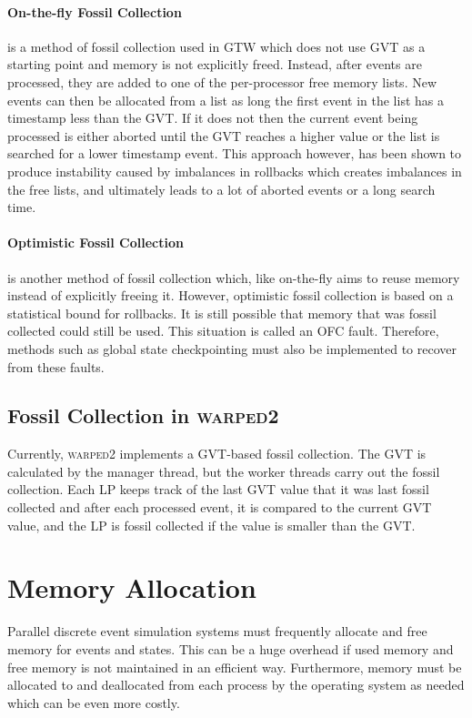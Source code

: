 \documentclass[11pt]{book}
\begin{document}
\paragraph{On-the-fly Fossil Collection} is a method of fossil collection used in GTW
which does not use GVT as a starting point and memory is not explicitly freed. Instead, after
events are processed, they are added to one of the per-processor free memory lists. New events
can then be allocated from a list as long the first event in the list has a timestamp less than
the GVT. If it does not then the current event being processed is either aborted until the GVT
reaches a higher value or the list is searched for a lower timestamp event. This approach however,
has been shown to produce instability caused by imbalances in rollbacks which creates imbalances
in the free lists, and ultimately leads to a lot of aborted events or a long search time.

\paragraph{Optimistic Fossil Collection} is another method of fossil collection which, like
on-the-fly aims to reuse memory instead of explicitly freeing it. However, optimistic fossil
collection is based on a statistical bound for rollbacks. It is still possible that memory that
was fossil collected could still be used. This situation is called an OFC fault. Therefore,
methods such as global state checkpointing must also be implemented to recover from these faults.

\subsection{Fossil Collection in \textsc{warped2}}

Currently, \textsc{warped2} implements a GVT-based fossil collection. The GVT is calculated by
the manager thread, but the worker threads carry out the fossil collection. Each LP keeps track
of the last GVT value that it was last fossil collected and after each processed event, it is
compared to the current GVT value, and the LP is fossil collected if the value is smaller than
the GVT.

\section{Memory Allocation}

Parallel discrete event simulation systems must frequently allocate and free memory for
events and states. This can be a huge overhead if used memory and free memory is not
maintained in an efficient way. Furthermore, memory must be allocated to and deallocated from
each process by the operating system as needed which can be even more costly.
\end{document}
